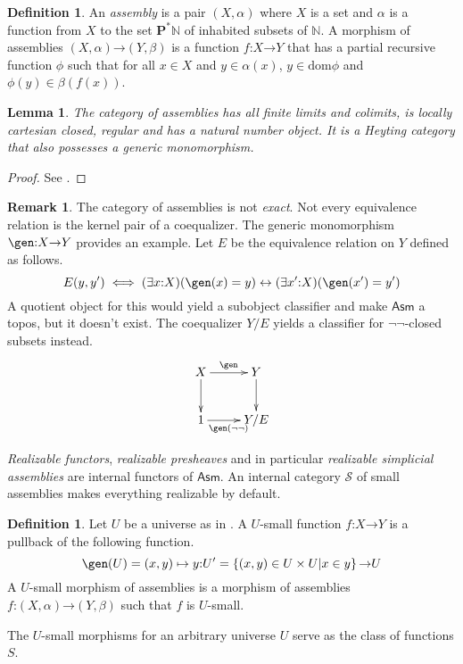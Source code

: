 \documentclass{amsart}
\theoremstyle{plain}
\newtheorem{lemma}[theorem]{Lemma}
\theoremstyle{definition}
\newtheorem{defin}[theorem]{Definition}
\newtheorem{remark}[theorem]{Remark}
\newcommand\cat\mathcal
\newcommand\set[1]{\left\{#1\right\}}
\newcommand\dom{\mathrm{dom}}
\newcommand\N{\mathbb N}
\newcommand\pow{\mathbf P}
\newcommand\Asm{\mathsf{Asm}}
\newcommand\of{\mathord:}
\renewcommand\to{\mathord\rightarrow}
\begin{document}
\begin{defin} An \emph{assembly} is a pair $(X,\alpha)$ where $X$ is a set and $\alpha$ is a function from $X$ to the set $\pow^*\N$ of inhabited subsets of $\N$. A morphism of assemblies $(X,\alpha)\to(Y,\beta)$ is a function $f\of X\to Y$ that has a partial recursive function $\phi$ such that for all $x\in X$ and $y\in \alpha(x)$, $y\in\dom\phi$ and $\phi(y)\in \beta(f(x))$.
\end{defin}


\begin{lemma} The category of assemblies has all finite limits and colimits, is locally cartesian closed, regular and has a natural number object. It is a Heyting category that also possesses a generic monomorphism.
\end{lemma}

\begin{proof} See \cite{MR2479466,MSC:8896618,RealCats}. \end{proof}

\begin{remark} The category of assemblies is not \emph{exact}. Not every equivalence relation is the kernel pair of a coequalizer. The generic monomorphism $\gen\of X\to Y$ provides an example. Let $E$ be the equivalence relation on $Y$ defined as follows.
\[ E(y,y') \iff (\exists x\of X)(\gen(x)=y)\leftrightarrow (\exists x'\of X)(\gen(x')=y') \]
A quotient object for this would yield a subobject classifier and make $\Asm$ a topos, but it doesn't exist. The coequalizer $Y/E$ yields a classifier for $\neg\neg$-closed subsets instead.
\[\xymatrix{
X\ar[r]^\gen\ar[d] & Y\ar[d] \\
1\ar[r]_{\gen(\neg\neg)} & Y/E
}\]
\end{remark}

\emph{Realizable functors}, \emph{realizable presheaves} and in particular \emph{realizable simplicial assemblies} are internal functors of $\Asm$. An internal category $\cat S$ of small assemblies makes everything realizable by default.

\begin{defin} Let $U$ be a universe as in \cite{MR0354798}. A $U$-small function $f\of X\to Y$ is a pullback of the following function.
\[ \gen(U) = (x,y)\mapsto y\of U'=\set{(x,y)\in U\times U\middle| x\in y}\to U\]
A $U$-small morphism of assemblies is a morphism of assemblies $f\of(X,\alpha)\to(Y,\beta)$ such that $f$ is $U$-small.
\end{defin}

The $U$-small morphisms for an arbitrary universe $U$ serve as the class of functions $S$.
\end{document}
